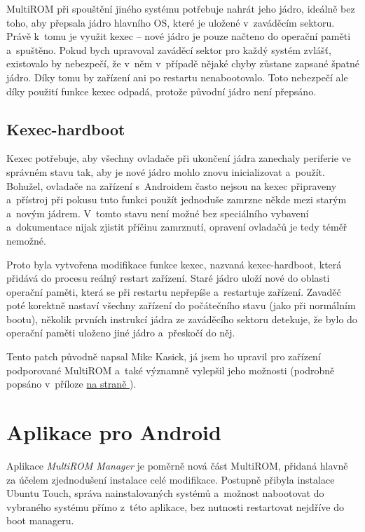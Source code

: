 \documentclass[12pt, a4paper, oneside]{article}
\newcommand{\It}{\textit}  %
\newcommand*{\attref}[1]{\hyperref[{#1}]{\uv{\nameref*{#1}} na straně \pageref{#1}}}
\begin{document}
MultiROM při spouštění jiného systému potřebuje nahrát jeho jádro, ideálně bez toho, aby přepsala jádro hlavního OS, které je uložené v~zaváděcím sektoru. Právě k~tomu je využit kexec -- nové jádro je pouze načteno do operační paměti a~spuštěno. Pokud bych upravoval zaváděcí sektor pro každý systém zvlášť, existovalo by nebezpečí, že v~něm v~případě nějaké chyby zůstane zapsané špatné jádro. Díky tomu by zařízení ani po restartu nenabootovalo. Toto nebezpečí ale díky použití funkce kexec odpadá, protože původní jádro není přepsáno.

\subsection{Kexec-hardboot}
Kexec potřebuje, aby všechny ovladače při ukončení jádra zanechaly periferie ve správném stavu tak, aby je nové jádro mohlo znovu inicializovat a~použít. Bohužel, ovladače na zařízení s~Androidem často nejsou na kexec připraveny a~přístroj při pokusu tuto funkci použít jednoduše zamrzne někde mezi starým a~novým jádrem. V~tomto stavu není možné bez speciálního vybavení a~dokumentace nijak zjistit příčinu zamrznutí, opravení ovladačů je tedy téměř nemožné.

Proto byla vytvořena modifikace funkce kexec, nazvaná kexec-hardboot, která přidává do procesu reálný restart zařízení. Staré jádro uloží nové do oblasti operační paměti, která se při restartu nepřepíše a~restartuje zařízení. Zavaděč poté korektně nastaví všechny zařízení do počátečního stavu (jako při normálním bootu), několik prvních instrukcí jádra ze zaváděcího sektoru detekuje, že bylo do operační paměti uloženo jiné jádro a~přeskočí do něj.

Tento patch původně napsal Mike Kasick\cite{kexec-hardboot-orig}, já jsem ho upravil pro zařízení podporované MultiROM a~také významně vylepšil jeho možnosti (podrobně popsáno v~příloze \attref{sec:kexec-hardboot}).

\newpage

\section{Aplikace pro Android}
Aplikace \It{MultiROM Manager} je poměrně nová část MultiROM, přidaná hlavně za účelem zjednodušení instalace celé modifikace. Postupně přibyla instalace Ubuntu Touch, správa nainstalovaných systémů a~možnost nabootovat do vybraného systému přímo z~této aplikace, bez nutnosti restartovat nejdříve do boot manageru.
\end{document}
